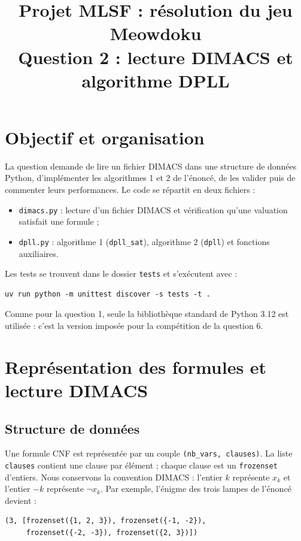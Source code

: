 \documentclass[11pt,a4paper]{article}
\title{Projet MLSF : résolution du jeu Meowdoku\\
  \large Question 2 : lecture DIMACS et algorithme DPLL}
\author{}
\date{}
\begin{document}
\maketitle

\section{Objectif et organisation}

La question demande de lire un fichier DIMACS dans une structure de données
Python, d'implémenter les algorithmes 1 et 2 de l'énoncé, de les valider puis
de commenter leurs performances. Le code se répartit en deux fichiers :
\begin{itemize}
  \item \texttt{dimacs.py} : lecture d'un fichier DIMACS et vérification
    qu'une valuation satisfait une formule ;
  \item \texttt{dpll.py} : algorithme 1 (\texttt{dpll\_sat}), algorithme 2
    (\texttt{dpll}) et fonctions auxiliaires.
\end{itemize}
Les tests se trouvent dans le dossier \texttt{tests} et s'exécutent avec :
\begin{lstlisting}
uv run python -m unittest discover -s tests -t .
\end{lstlisting}
Comme pour la question 1, seule la bibliothèque standard de Python 3.12 est
utilisée : c'est la version imposée pour la compétition de la question 6.

\section{Représentation des formules et lecture DIMACS}

\subsection{Structure de données}

Une formule CNF est représentée par un couple \texttt{(nb\_vars, clauses)}.
La liste \texttt{clauses} contient une clause par élément ; chaque clause est
un \texttt{frozenset} d'entiers. Nous conservons la convention DIMACS :
l'entier $k$ représente $x_k$ et l'entier $-k$ représente $\neg x_k$.
Par exemple, l'énigme des trois lampes de l'énoncé devient :
\begin{lstlisting}
(3, [frozenset({1, 2, 3}), frozenset({-1, -2}),
     frozenset({-2, -3}), frozenset({2, 3})])
\end{lstlisting}
\end{document}
